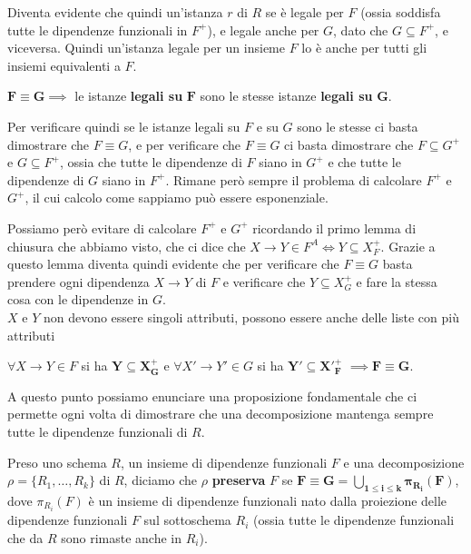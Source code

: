 \documentclass[11pt, a4paper, titlepage, oneside]{scrbook}
\begin{document}
Diventa evidente che quindi un'istanza $r$ di $R$ se è legale per $F$ (ossia soddisfa tutte le dipendenze funzionali in $F^+$), e legale anche per $G$, dato che $G \subseteq F^+$, e viceversa. Quindi un'istanza legale per un insieme $F$ lo è anche per tutti gli insiemi equivalenti a $F$.

\begin{Proposizione}[Corollario]
\label{propos-corol-finale}
$\bm{F \equiv G} \implies$ le istanze \textbf{legali su} $\bm{F}$ sono le stesse istanze \textbf{legali su} $\bm{G}$.
\end{Proposizione}

Per verificare quindi se le istanze legali su $F$ e su $G$ sono le stesse ci basta dimostrare che $F \equiv G$, e per verificare che $F \equiv G$ ci basta dimostrare che $F \subseteq G^+$ e $G \subseteq F^+$, ossia che tutte le dipendenze di $F$ siano in $G^+$ e che tutte le dipendenze di $G$ siano in $F^+$. Rimane però sempre il problema di calcolare $F^+$ e $G^+$, il cui calcolo come sappiamo può essere esponenziale. 

Possiamo però evitare di calcolare $F^+$ e $G^+$ ricordando il primo lemma di chiusura che abbiamo visto, che ci dice che $X \longrightarrow Y \in F^A \iff Y \subseteq X^+_F$. Grazie a questo lemma diventa quindi evidente che per verificare che $F \equiv G$ basta prendere ogni dipendenza $X \longrightarrow Y$ di $F$ e verificare che $Y \subseteq X^+_G$ e fare la stessa cosa con le dipendenze in $G$. \\
\NB $X$ e $Y$ non devono essere singoli attributi, possono essere anche delle liste con più attributi

\begin{Proposizione}[Corollario]
\label{propos-corollario-finalissimo}
$\forall X \longrightarrow Y \in F$ si ha $\bm{Y \subseteq X^+_G}$ e $\forall X' \longrightarrow Y' \in G$ si ha $\bm{Y' \subseteq {X'}^+_F}$ $\implies \bm{F \equiv G}$.
\end{Proposizione}

A questo punto possiamo enunciare una proposizione fondamentale che ci permette ogni volta di dimostrare che una decomposizione mantenga sempre tutte le dipendenze funzionali di $R$.

\begin{Proposizione}
\label{propos-decomposizione-preserva-dipendenze}
Preso uno schema $R$, un insieme di dipendenze funzionali $F$ e una decomposizione $\rho = \{R_1, \ldots, R_k\}$ di $R$, diciamo che $\rho$ \textbf{preserva} $F$ se $\bm{F \equiv G = \bigcup_{1 \leq i \leq k} \pi_{R_i}(F)}$, dove $\pi_{R_i}(F)$ è un insieme di dipendenze funzionali nato dalla proiezione delle dipendenze funzionali $F$ sul sottoschema $R_i$ (ossia tutte le dipendenze funzionali che da $R$ sono rimaste anche in $R_i$).
\end{Proposizione}
\end{document}
